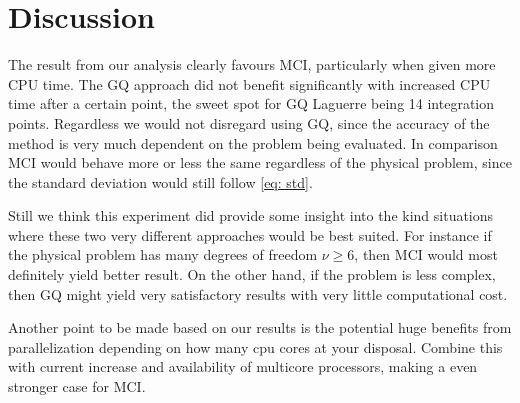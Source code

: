 \section{Discussion}
The result from our analysis clearly favours MCI, particularly when
given more CPU time. The GQ approach did not benefit significantly with
increased 
CPU time after a certain point, the sweet spot for GQ Laguerre being 14
integration points. Regardless we would not disregard using GQ, since the
accuracy of the method is very much dependent on the problem being evaluated.
In comparison MCI would behave more or less the same regardless of the physical
problem, since the standard deviation would still follow \cref{eq: std}. 

Still we think this experiment did provide some insight into the kind situations where
these two very different approaches would be best suited. For instance if the
physical problem has many degrees of freedom $\nu \ge 6 $, then MCI would most
definitely yield better result. On the other hand, if the problem is less complex,
then GQ might yield very satisfactory results with very little computational cost.  

Another point to be made based on our results is the potential huge benefits
from parallelization depending on how many cpu cores at your disposal. Combine
this with current increase and availability of multicore processors, making a
even stronger case for MCI. 